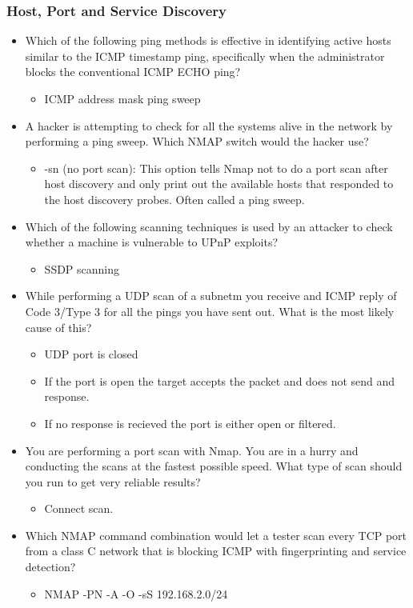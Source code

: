 \subsubsection{Host, Port and Service Discovery}
\begin{itemize}
    \item Which of the following ping methods is effective in identifying active hosts similar to the ICMP timestamp ping, specifically when the administrator blocks the conventional ICMP ECHO ping?
    \begin{itemize}
        \item ICMP address mask ping sweep
    \end{itemize}
    \item A hacker is attempting to check for all the systems alive in the network by performing a ping sweep. Which NMAP switch would the hacker use?
    \begin{itemize}
        \item -sn (no port scan): This option tells Nmap not to do a port scan after host discovery and only print out the available hosts that responded to the host discovery probes. Often called a ping sweep.
    \end{itemize}
    \item Which of the following scanning techniques is used by an attacker to check whether a machine is vulnerable to UPnP exploits?
    \begin{itemize}
        \item SSDP scanning
    \end{itemize}
    \item While performing a UDP scan of a subnetm you receive and ICMP reply of Code 3/Type 3 for all the pings you have sent out. What is the most likely cause of this?
    \begin{itemize}
        \item UDP port is closed
        \item If the port is open the target accepts the packet and does not send and response.
        \item If no response is recieved the port is either open or filtered.
    \end{itemize}
    \item You are performing a port scan with Nmap. You are in a hurry and conducting the scans at the fastest possible speed. What type of scan should you run to get very reliable results?
    \begin{itemize}
        \item Connect scan.
    \end{itemize}
    \item Which NMAP command combination would let a tester scan every TCP port from a class C network that is blocking ICMP with fingerprinting and service detection?
    \begin{itemize}
        \item NMAP -PN -A -O -sS 192.168.2.0/24
    \end{itemize}
\end{itemize}
